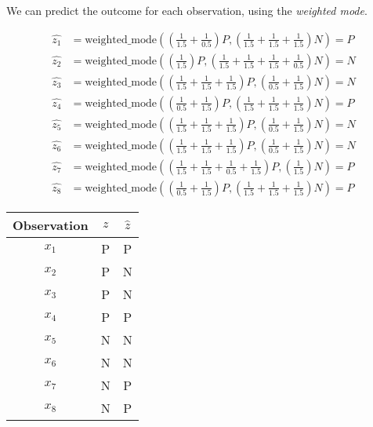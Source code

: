 \documentclass[12pt]{article}
\begin{document}
\begin{enumerate}[leftmargin=\labelsep]
          We can predict the outcome for each observation, using the \textit{weighted mode}.

          \[
              \begin{aligned}
                  \hat{z_1} & = \text{weighted\_mode} \left(\left(\frac{1}{1.5}+\frac{1}{0.5}\right)P,\left(\frac{1}{1.5}+\frac{1}{1.5}+\frac{1}{1.5}\right)N\right) = P \\
                  \hat{z_2} & = \text{weighted\_mode} \left(\left(\frac{1}{1.5}\right)P,\left(\frac{1}{1.5}+\frac{1}{1.5}+\frac{1}{1.5}+\frac{1}{0.5}\right)N\right) = N \\
                  \hat{z_3} & = \text{weighted\_mode} \left(\left(\frac{1}{1.5}+\frac{1}{1.5}+\frac{1}{1.5}\right)P,\left(\frac{1}{0.5}+\frac{1}{1.5}\right)N\right) = N \\
                  \hat{z_4} & = \text{weighted\_mode} \left(\left(\frac{1}{0.5}+\frac{1}{1.5}\right)P,\left(\frac{1}{1.5}+\frac{1}{1.5}+\frac{1}{1.5}\right)N\right) = P \\
                  \hat{z_5} & = \text{weighted\_mode} \left(\left(\frac{1}{1.5}+\frac{1}{1.5}+\frac{1}{1.5}\right)P,\left(\frac{1}{0.5}+\frac{1}{1.5}\right)N\right) = N \\
                  \hat{z_6} & = \text{weighted\_mode} \left(\left(\frac{1}{1.5}+\frac{1}{1.5}+\frac{1}{1.5}\right)P,\left(\frac{1}{0.5}+\frac{1}{1.5}\right)N\right) = N \\
                  \hat{z_7} & = \text{weighted\_mode} \left(\left(\frac{1}{1.5}+\frac{1}{1.5}+\frac{1}{0.5}+\frac{1}{1.5}\right)P,\left(\frac{1}{1.5}\right)N\right) = P \\
                  \hat{z_8} & = \text{weighted\_mode} \left(\left(\frac{1}{0.5}+\frac{1}{1.5}\right)P,\left(\frac{1}{1.5}+\frac{1}{1.5}+\frac{1}{1.5}\right)N\right) = P
              \end{aligned}
          \]

          \begin{center}
              \begin{tabular}{c|c|c}
                  Observation & \(z\) & \(\hat{z}\) \\
                  \hline
                  \(x_1\)     & P     & P           \\
                  \(x_2\)     & P     & N           \\
                  \(x_3\)     & P     & N           \\
                  \(x_4\)     & P     & P           \\
                  \(x_5\)     & N     & N           \\
                  \(x_6\)     & N     & N           \\
                  \(x_7\)     & N     & P           \\
                  \(x_8\)     & N     & P
              \end{tabular}
          \end{center}


\end{enumerate}
\end{document}
